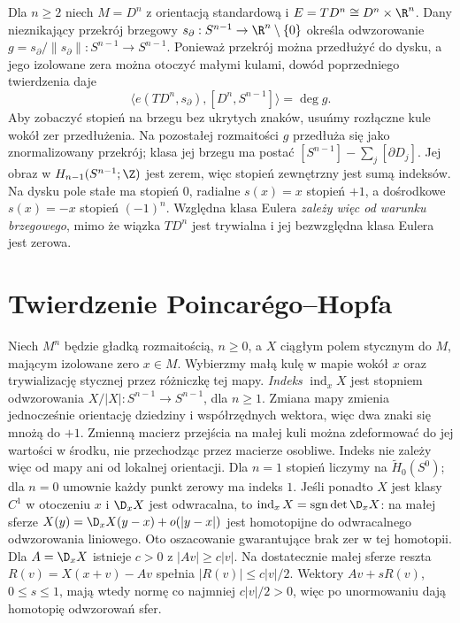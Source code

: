 \begin{przyklad}
\label{prz:euler-wzgledna-dysk-17}
Dla $n\ge2$ niech $M=D^n$ z orientacją standardową
i $E=TD^n\cong D^n\times\R^n$.
Dany nieznikający przekrój brzegowy
$s_{\partial}:S^{n-1}\to\R^n\setminus\{0\}$
określa odwzorowanie
$g=s_{\partial}/\|s_{\partial}\|:S^{n-1}\to S^{n-1}$.
Ponieważ przekrój można przedłużyć do dysku,
a jego izolowane zera można otoczyć małymi kulami,
dowód poprzedniego twierdzenia daje
\[
 \bigl\langle e(TD^n,s_{\partial}),
      [D^n,S^{n-1}]\bigr\rangle
   =\deg g.
\]
Aby zobaczyć stopień na brzegu bez ukrytych znaków,
usuńmy rozłączne kule wokół zer przedłużenia.
Na pozostałej rozmaitości $g$ przedłuża się
jako znormalizowany przekrój; klasa jej brzegu
ma postać $[S^{n-1}]-\sum_j[\partial D_j]$.
Jej obraz w $H_{n-1}(S^{n-1};\Z)$ jest zerem,
więc stopień zewnętrzny jest sumą indeksów.
Na dysku pole stałe ma stopień $0$,
radialne $s(x)=x$ stopień $+1$,
a dośrodkowe $s(x)=-x$ stopień $(-1)^n$.
Względna klasa Eulera \emph{zależy więc od
warunku brzegowego}, mimo że wiązka $TD^n$
jest trywialna i jej bezwzględna klasa
Eulera jest zerowa.
\end{przyklad}

\section{Twierdzenie Poincarégo--Hopfa}
\label{sec:poincare-hopf-16}

\begin{definicja}
Niech $M^n$ będzie gładką rozmaitością, $n\geq0$,
a $X$ ciągłym polem stycznym do $M$, mającym
izolowane zero $x\in M$. Wybierzmy małą kulę w mapie wokół $x$
oraz trywializację stycznej przez różniczkę tej mapy.
\emph{Indeks} $\operatorname{ind}_x X$
jest stopniem odwzorowania
$X/|X|:S^{n-1}\to S^{n-1}$, dla $n\geq1$.
Zmiana mapy zmienia jednocześnie orientację dziedziny
i współrzędnych wektora, więc dwa znaki się mnożą
do $+1$. Zmienną macierz przejścia na małej kuli
można zdeformować do jej wartości w środku, nie
przechodząc przez macierze osobliwe. Indeks nie
zależy więc od mapy ani od lokalnej orientacji.
Dla $n=1$ stopień liczymy na $\widetilde H_0(S^0)$;
dla $n=0$ umownie każdy punkt zerowy ma indeks $1$.
Jeśli ponadto $X$ jest klasy $C^1$ w otoczeniu $x$
i $\D_xX$ jest
odwracalna, to
$\operatorname{ind}_xX
=\operatorname{sgn}\det\D_xX$:
na małej sferze
$X(y)=\D_xX(y-x)+o(|y-x|)$
jest homotopijne
do odwracalnego
odwzorowania liniowego.
Oto oszacowanie gwarantujące brak zer w tej homotopii.
Dla $A=\D_xX$ istnieje $c>0$ z $|Av|\geq c|v|$.
Na dostatecznie małej sferze reszta $R(v)=X(x+v)-Av$
spełnia $|R(v)|\leq c|v|/2$.
Wektory $Av+sR(v)$, $0\leq s\leq1$, mają wtedy normę
co najmniej $c|v|/2>0$, więc po unormowaniu dają
homotopię odwzorowań sfer.
\end{definicja}

